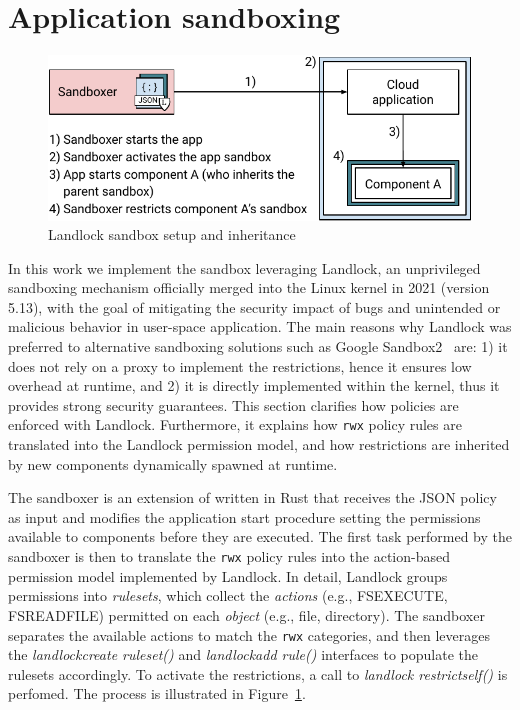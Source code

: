 \section{Application sandboxing}\label{sect:sandbox}

\begin{figure}[t!]
  \centering
  \includegraphics[width=0.8\columnwidth]{chapters/dmng/fig/landlock_overview.pdf}
  \caption{Landlock sandbox setup and inheritance}
  \label{fig:landlock}
\end{figure}

In this work we implement the sandbox leveraging Landlock, an
unprivileged sandboxing mechanism officially merged into the Linux
kernel in 2021 (version 5.13), with the goal of mitigating the
security impact of bugs and unintended or malicious behavior in
user-space application. The main reasons why Landlock was preferred to
alternative sandboxing solutions such as Google
Sandbox2~\cite{sandbox2} are: 1) it does not rely on a proxy to
implement the restrictions, hence it ensures low overhead at runtime,
and 2) it is directly implemented within the kernel, thus it provides
strong security guarantees. This section clarifies how policies are
enforced with Landlock. Furthermore, it explains how {\tt rwx} policy
rules are translated into the Landlock permission model, and how
restrictions are inherited by new components dynamically spawned at
runtime.

The sandboxer is an extension of \dmng written in Rust that receives
the JSON policy as input and modifies the application start procedure
setting the permissions available to components before they are
executed. The first task performed by the sandboxer is then to
translate the {\tt rwx} policy rules into the action-based permission
model implemented by Landlock. In detail, Landlock groups permissions
into {\em rulesets}, which collect the {\em actions} (e.g.,
FS\textunderscore EXECUTE, FS\textunderscore READ\textunderscore FILE)
permitted on each {\em object} (e.g., file, directory). The sandboxer
separates the available actions to match the {\tt rwx} categories, and
then leverages the {\em landlock\textunderscore create\textunderscore
  ruleset()} and {\em landlock\textunderscore add\textunderscore
  rule()} interfaces to populate the rulesets accordingly. To activate
the restrictions, a call to {\em landlock\textunderscore
  restrict\textunderscore self()} is perfomed. The process is
illustrated in Figure~\ref{fig:landlock}.

